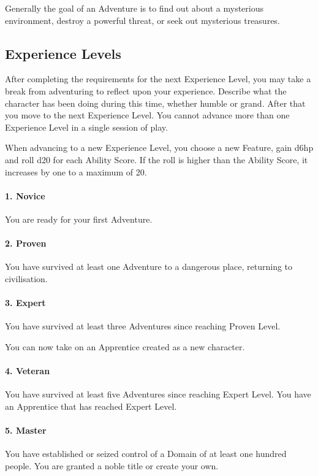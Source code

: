 \documentclass[itdr]{subfiles}
\begin{document}
Generally the goal of an Adventure is to find out about a mysterious environment, destroy a powerful threat, or seek out mysterious treasures.

\subsection{Experience Levels}
After completing the requirements for the next Experience Level, you may take a break from adventuring to reflect upon your experience. Describe what the character has been doing during this time, whether humble or grand. After that you move to the next Experience Level. You cannot advance more than one Experience Level in a single session of play.

When advancing to a new Experience Level, you choose a new Feature, gain d6hp and roll d20 for each Ability Score. If the roll is higher than the Ability Score, it increases by one to a maximum of 20.

\paragraph{1. Novice}
You are ready for your first Adventure.

\paragraph{2. Proven}
You have survived at least one Adventure to a dangerous place, returning to civilisation.

\paragraph{3. Expert}
You have survived at least three Adventures since reaching Proven Level.

You can now take on an Apprentice created as a new character.

\paragraph{4. Veteran}
You have survived at least five Adventures since reaching Expert Level. You have an Apprentice that has reached Expert Level.

\paragraph{5. Master}
You have established or seized control of a Domain of at least one hundred people. You are granted a noble title or create your own.
\end{document}
